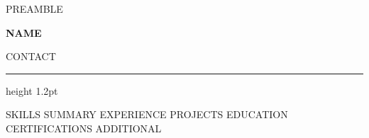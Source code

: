 %
%
{{PREAMBLE}}


\renewcommand{\cvsectionfont}[1]{{\large\bfseries\color{cvaccent} #1}}
\renewcommand{\cvsectionrule}{\vspace{1.5pt}{\color{cvaccent!40}\hrule height 0.8pt}}

\renewcommand{\cvheader}[2]{%
  {\fontsize{22}{25}\selectfont\bfseries #1}\par\vspace{3pt}%
  {\small\color{cvmuted} #2}\par\vspace{4pt}%
  {\color{cvaccent}\hrule height 1.2pt}%
  \vspace{2pt}%
}



\cvheader{ {{NAME}} }{ {{CONTACT}} }

{{SKILLS}}
{{SUMMARY}}
{{EXPERIENCE}}
{{PROJECTS}}
{{EDUCATION}}
{{CERTIFICATIONS}}
{{ADDITIONAL}}


